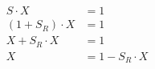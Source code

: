 \documentclass[12pt]{article}
\begin{document}
\sicpsize

\begin{align*}
S \cdot X &= 1\\
(1 + S_R) \cdot X &= 1\\
X + S_R \cdot X &= 1\\
X &= 1 - S_R \cdot X
\end{align*}
\end{document}
